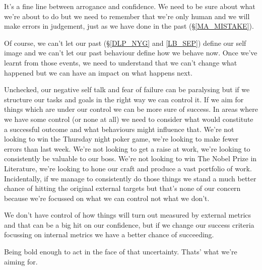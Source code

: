 \cleardoublepage
{\small

It's a fine line between arrogance and confidence. We need to be sure about what we're about to do but we need to remember that we're only human and we will make errors in judgement, just as we have done in the past (\S \ref{MA_MISTAKE}). 

Of course, we can't let our past (\S \ref{DLP_NYG} and \ref{LB_SEP}) define our self image and we can't let our past behaviour define how we behave now. Once we've learnt from those events, we need to understand that we can't change what happened but we can have an impact on what happens next.

Unchecked, our negative self talk and fear of failure can be paralysing but if we structure our tasks and goals in the right way we can control it. If we aim for things which are under our control we can be more sure of success. In areas where we have some control (or none at all) we need to consider what would constitute a successful outcome and what behaviours might influence that. We're not looking to win the Thursday night poker game, we're looking to make fewer errors than last week. We're not looking to get a raise at work, we're looking to consistently be valuable to our boss. We're not looking to win The Nobel Prize in Literature, we're looking to hone our craft and produce a vast portfolio of work.
Incidentally, if we manage to consistently do those things we stand a much better chance of hitting the original external targets but that's none of our concern because we're focussed on what we can control not what we don't.

We don't have control of how things will turn out measured by external metrics and that can be a big hit on our confidence, but if we change our success criteria focussing on internal metrics we have a better chance of succeeding. 

Being bold enough to act in the face of that uncertainty. Thats' what we're aiming for.



}
